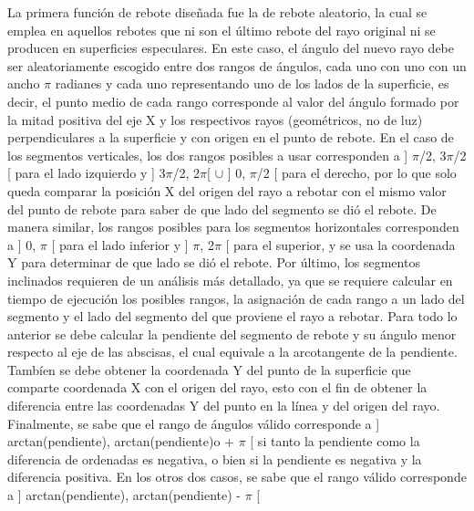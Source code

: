 \documentclass[conference]{IEEEtran}
\begin{document}
La primera función de rebote diseñada fue la de rebote aleatorio, la cual se emplea en aquellos rebotes que ni son el último rebote del rayo original ni se producen en superficies especulares. En este caso, el ángulo del nuevo rayo debe ser aleatoriamente escogido entre dos rangos de ángulos, cada uno con uno con un ancho $\pi$ radianes y cada uno representando uno de los lados de la superficie, es decir, el punto medio de cada rango corresponde al valor del ángulo formado por la mitad positiva del eje X y los respectivos rayos (geométricos, no de luz) perpendiculares a la superficie y con origen en el punto de rebote. En el caso de los segmentos verticales, los dos rangos posibles a usar corresponden a ] $\pi$/2, 3$\pi$/2 [ para el lado izquierdo y ] 3$\pi$/2, 2$\pi$[ $\cup$ ] 0,  $\pi$/2 [ para el derecho, por lo que solo queda comparar la posición X del origen del rayo a rebotar con el mismo valor del punto de rebote para saber de que lado del segmento se dió el rebote. De manera similar, los rangos posibles para los segmentos horizontales corresponden a ] 0, $\pi$ [ para el lado inferior y ]  $\pi$,  2$\pi$ [ para el superior, y se usa la coordenada Y para determinar de que lado se dió el rebote. Por último, los segmentos inclinados requieren de un análisis más detallado, ya que se requiere calcular en tiempo de ejecución los posibles rangos, la asignación de cada rango a un lado del segmento y el lado del segmento del que proviene el rayo a rebotar. Para todo lo anterior se debe calcular la pendiente del segmento de rebote y su ángulo menor respecto al eje de las abscisas, el cual equivale a la arcotangente de la pendiente. Tambíen se debe obtener la coordenada Y del punto de la superficie que comparte coordenada X con el origen del rayo, esto con el fin de obtener la diferencia entre las coordenadas Y del punto en la línea y del origen del rayo. Finalmente, se sabe que el rango de ángulos válido corresponde a ] arctan(pendiente), arctan(pendiente)o + $\pi$ [ si tanto la pendiente como la diferencia de ordenadas es negativa, o bien si la pendiente es negativa y la diferencia positiva. En los otros dos casos, se sabe que el rango válido corresponde a ] arctan(pendiente), arctan(pendiente) - $\pi$ [
\end{document}
